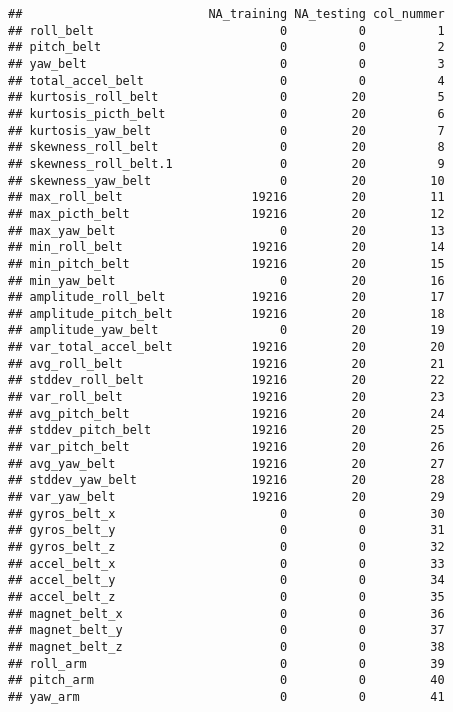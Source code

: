 \documentclass[]{article}
\begin{document}
\begin{verbatim}
##                          NA_training NA_testing col_nummer
## roll_belt                          0          0          1
## pitch_belt                         0          0          2
## yaw_belt                           0          0          3
## total_accel_belt                   0          0          4
## kurtosis_roll_belt                 0         20          5
## kurtosis_picth_belt                0         20          6
## kurtosis_yaw_belt                  0         20          7
## skewness_roll_belt                 0         20          8
## skewness_roll_belt.1               0         20          9
## skewness_yaw_belt                  0         20         10
## max_roll_belt                  19216         20         11
## max_picth_belt                 19216         20         12
## max_yaw_belt                       0         20         13
## min_roll_belt                  19216         20         14
## min_pitch_belt                 19216         20         15
## min_yaw_belt                       0         20         16
## amplitude_roll_belt            19216         20         17
## amplitude_pitch_belt           19216         20         18
## amplitude_yaw_belt                 0         20         19
## var_total_accel_belt           19216         20         20
## avg_roll_belt                  19216         20         21
## stddev_roll_belt               19216         20         22
## var_roll_belt                  19216         20         23
## avg_pitch_belt                 19216         20         24
## stddev_pitch_belt              19216         20         25
## var_pitch_belt                 19216         20         26
## avg_yaw_belt                   19216         20         27
## stddev_yaw_belt                19216         20         28
## var_yaw_belt                   19216         20         29
## gyros_belt_x                       0          0         30
## gyros_belt_y                       0          0         31
## gyros_belt_z                       0          0         32
## accel_belt_x                       0          0         33
## accel_belt_y                       0          0         34
## accel_belt_z                       0          0         35
## magnet_belt_x                      0          0         36
## magnet_belt_y                      0          0         37
## magnet_belt_z                      0          0         38
## roll_arm                           0          0         39
## pitch_arm                          0          0         40
## yaw_arm                            0          0         41

\end{verbatim}
\end{document}

